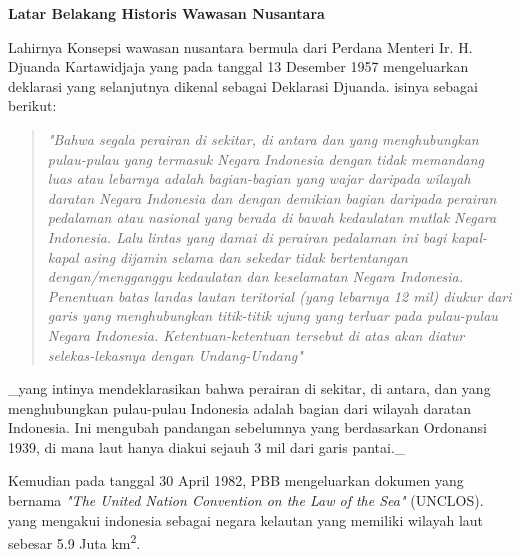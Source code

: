 \documentclass[12pt, a4paper]{article}
\begin{document}
\textbf{Latar Belakang Historis Wawasan Nusantara}

Lahirnya Konsepsi wawasan nusantara bermula dari Perdana Menteri Ir. H. Djuanda Kartawidjaja yang pada tanggal 13 Desember 1957 mengeluarkan deklarasi yang selanjutnya dikenal sebagai Deklarasi Djuanda. isinya sebagai berikut:
\begin{quote}
\itshape "Bahwa segala perairan di sekitar, di antara dan yang menghubungkan pulau-pulau yang termasuk Negara Indonesia dengan tidak memandang luas atau lebarnya adalah bagian-bagian yang wajar daripada wilayah daratan Negara Indonesia dan dengan demikian bagian daripada perairan pedalaman atau nasional yang berada di bawah kedaulatan mutlak Negara Indonesia. Lalu lintas yang damai di perairan pedalaman ini bagi kapal-kapal asing dijamin selama dan sekedar tidak bertentangan dengan/mengganggu kedaulatan dan keselamatan Negara Indonesia. Penentuan batas landas lautan teritorial (yang lebarnya 12 mil) diukur dari garis yang menghubungkan titik-titik ujung yang terluar pada pulau-pulau Negara Indonesia. Ketentuan-ketentuan tersebut di atas akan diatur selekas-lekasnya dengan Undang-Undang"
\end{quote}
_yang intinya mendeklarasikan bahwa perairan di sekitar, di antara, dan yang menghubungkan pulau-pulau Indonesia adalah bagian dari wilayah daratan Indonesia. Ini mengubah pandangan sebelumnya yang berdasarkan Ordonansi 1939, di mana laut hanya diakui sejauh 3 mil dari garis pantai._ %

Kemudian pada tanggal 30 April 1982, PBB mengeluarkan dokumen yang bernama \textit{"The United Nation Convention on the Law of the Sea"} (UNCLOS). yang mengakui indonesia sebagai negara kelautan yang memiliki wilayah laut sebesar 5.9 Juta km\textsuperscript{2}.

\end{document}
